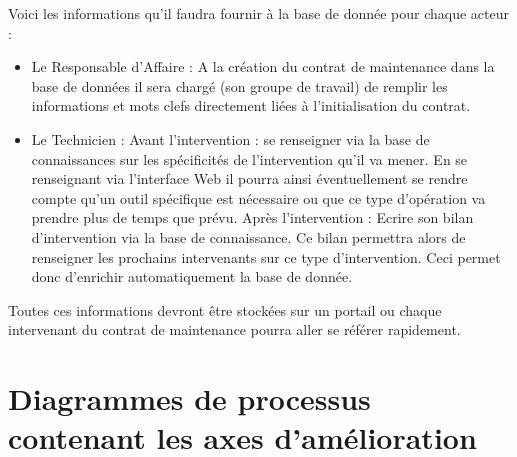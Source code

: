 Voici les informations qu'il faudra fournir à la base de donnée pour chaque acteur : 
\begin{itemize}
\item Le Responsable d'Affaire : A la création du contrat de maintenance dans la base de données il sera chargé (son groupe de travail) de remplir les informations et mots clefs directement liées à l'initialisation du contrat.
\item Le Technicien : Avant l'intervention : se renseigner via la base de connaissances sur les spécificités de l'intervention qu'il va mener. En se renseignant via l'interface Web il pourra ainsi éventuellement se rendre compte qu'un outil spécifique est nécessaire ou que ce type d'opération va prendre plus de temps que prévu.
Après l'intervention : Ecrire son bilan d'intervention via la base de connaissance. Ce bilan permettra alors de renseigner les prochains intervenants sur ce type d'intervention. Ceci permet donc d'enrichir automatiquement la base de donnée. 
\end{itemize}



Toutes ces informations devront être stockées sur un portail ou chaque intervenant du contrat de maintenance pourra aller se référer rapidement.

\section{Diagrammes de processus contenant les axes d'amélioration}





